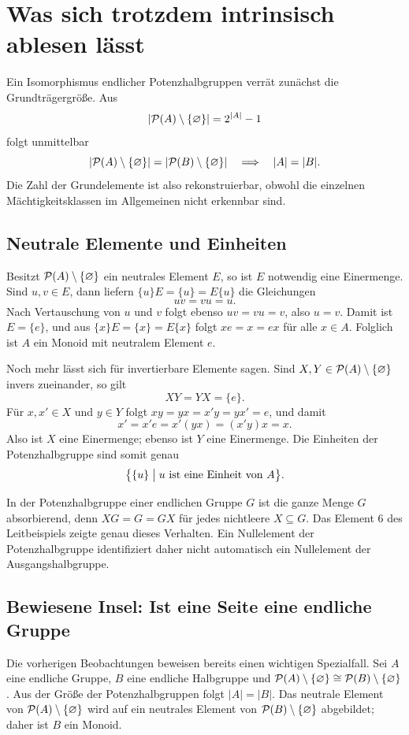 \documentclass[main.tex]{subfiles}
\begin{document}
\section{Was sich trotzdem intrinsisch ablesen lässt}

Ein Isomorphismus endlicher Potenzhalbgruppen verrät zunächst die
Grundträgergröße.  Aus
\[
  |\mathcal{P}(A)\setminus\{\varnothing\}|=2^{|A|}-1
\]
folgt unmittelbar
\[
  |\mathcal{P}(A)\setminus\{\varnothing\}|=|\mathcal{P}(B)\setminus\{\varnothing\}|
  \quad\Longrightarrow\quad
  |A|=|B|.
\]
Die Zahl der Grundelemente ist also rekonstruierbar, obwohl die einzelnen
Mächtigkeitsklassen im Allgemeinen nicht erkennbar sind.

\subsection{Neutrale Elemente und Einheiten}

Besitzt \(\mathcal{P}(A)\setminus\{\varnothing\}\) ein neutrales Element \(E\), so ist \(E\) notwendig
eine Einermenge.  Sind \(u,v\in E\), dann liefern
\(\{u\}E=\{u\}=E\{u\}\) die Gleichungen
\[
  uv=vu=u.
\]
Nach Vertauschung von \(u\) und \(v\) folgt ebenso \(uv=vu=v\), also
\(u=v\).  Damit ist \(E=\{e\}\), und aus
\(\{x\}E=\{x\}=E\{x\}\) folgt \(xe=x=ex\) für alle \(x\in A\).
Folglich ist \(A\) ein Monoid mit neutralem Element \(e\).

Noch mehr lässt sich für invertierbare Elemente sagen.  Sind
\(X,Y\in\mathcal{P}(A)\setminus\{\varnothing\}\) invers zueinander, so gilt
\[
  XY=YX=\{e\}.
\]
Für \(x,x'\in X\) und \(y\in Y\) folgt \(xy=yx=x'y=yx'=e\), und damit
\[
  x'=x'e=x'(yx)=(x'y)x=x.
\]
Also ist \(X\) eine Einermenge; ebenso ist \(Y\) eine Einermenge.  Die
Einheiten der Potenzhalbgruppe sind somit genau
\[
  \bigl\{\{u\}\bigm|u\text{ ist eine Einheit von }A\bigr\}.
\]

\begin{remark}
In der Potenzhalbgruppe einer endlichen Gruppe \(G\) ist die ganze Menge
\(G\) absorbierend, denn \(XG=G=GX\) für jedes nichtleere \(X\subseteq G\).
Das Element \(6\) des Leitbeispiels zeigte genau dieses Verhalten.  Ein
Nullelement der Potenzhalbgruppe identifiziert daher nicht automatisch ein
Nullelement der Ausgangshalbgruppe.
\end{remark}

\subsection{Bewiesene Insel: Ist eine Seite eine endliche Gruppe}

Die vorherigen Beobachtungen beweisen bereits einen wichtigen Spezialfall.
Sei \(A\) eine endliche Gruppe, \(B\) eine endliche Halbgruppe und
\(\mathcal{P}(A)\setminus\{\varnothing\}\cong\mathcal{P}(B)\setminus\{\varnothing\}\).  Aus der Größe der Potenzhalbgruppen folgt
\(|A|=|B|\).  Das neutrale Element von \(\mathcal{P}(A)\setminus\{\varnothing\}\) wird auf ein neutrales
Element von \(\mathcal{P}(B)\setminus\{\varnothing\}\) abgebildet; daher ist \(B\) ein Monoid.
\end{document}
